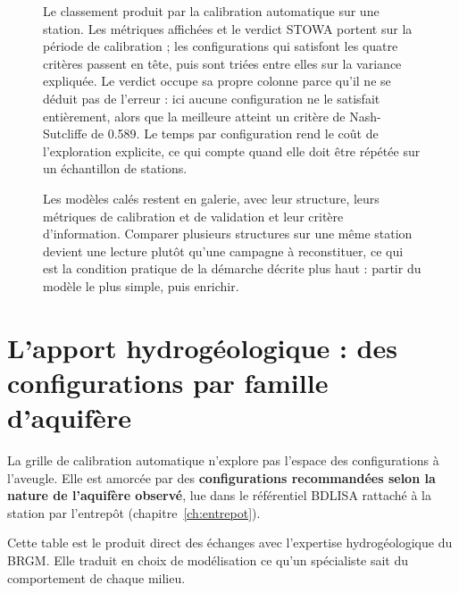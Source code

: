 \begin{figure}[htbp]
\centering
{}
\caption{Le classement produit par la calibration automatique sur une station. Les métriques
affichées et le verdict STOWA portent sur la période de calibration ; les configurations qui
satisfont les quatre critères passent en tête, puis sont triées entre elles sur la variance
expliquée. Le verdict occupe sa propre colonne parce qu'il ne se déduit pas de l'erreur : ici
aucune configuration ne le satisfait entièrement, alors que la meilleure atteint un critère de
Nash-Sutcliffe de \num{0,589}. Le temps par configuration rend le coût de l'exploration explicite,
ce qui compte quand elle doit être répétée sur un échantillon de stations. \lecas}
\label{fig:pastas-calibration-auto}
\end{figure}

\begin{figure}[htbp]
\centering
{}
\caption{Les modèles calés restent en galerie, avec leur structure, leurs métriques de
calibration et de validation et leur critère d'information. Comparer plusieurs structures sur une
même station devient une lecture plutôt qu'une campagne à reconstituer, ce qui est la condition
pratique de la démarche décrite plus haut : partir du modèle le plus simple, puis enrichir. \lecas}
\label{fig:pastas-galerie}
\end{figure}

\section{L'apport hydrogéologique : des configurations par famille d'aquifère}

La grille de calibration automatique n'explore pas l'espace des configurations à l'aveugle. Elle
est amorcée par des \textbf{configurations recommandées selon la nature de l'aquifère observé},
lue dans le référentiel BDLISA rattaché à la station par l'entrepôt (chapitre~\ref{ch:entrepot}).

Cette table est le produit direct des échanges avec l'expertise hydrogéologique du BRGM. Elle
traduit en choix de modélisation ce qu'un spécialiste sait du comportement de chaque milieu.

